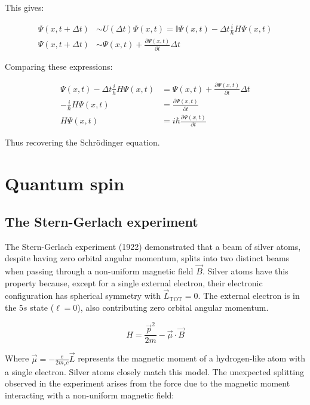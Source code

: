 \documentclass[italian]{HKNdocument}
\begin{document}
This gives:

\begin{align}
\Psi(x, t+\Delta t) & \sim U(\Delta t) \Psi(x, t)=\mathbb{I} \Psi(x, t)-\Delta t \frac{i}{\hbar} H \Psi(x, t)  \label{eq:10.59}\\
\Psi(x, t+\Delta t) & \sim \Psi(x, t)+\frac{\partial \Psi(x, t)}{\partial t} \Delta t \label{eq:10.60}
\end{align}

Comparing these expressions:

\begin{align}
\Psi(x, t)-\Delta t \frac{i}{\hbar} H \Psi(x, t) & =\Psi(x, t)+\frac{\partial \Psi(x, t)}{\partial t} \Delta t \\
-\frac{i}{\hbar} H \Psi(x, t) & =\frac{\partial \Psi(x, t)}{\partial t}  \label{eq:10.61}\\
H \Psi(x, t) & =i \hbar \frac{\partial \Psi(x, t)}{\partial t}
\end{align}

Thus recovering the Schrödinger equation.

\section{Quantum spin}
\subsection{The Stern-Gerlach experiment}
The Stern-Gerlach experiment (1922) demonstrated that a beam of silver atoms, despite having zero orbital angular momentum, splits into two distinct beams when passing through a non-uniform magnetic field $\vec{B}$. Silver atoms have this property because, except for a single external electron, their electronic configuration has spherical symmetry with $\vec{L}_{\text{TOT}}=0$. The external electron is in the $5s$ state ($\ell=0$), also contributing zero orbital angular momentum.


\begin{equation}
H=\frac{\vec{p}^{2}}{2 m}-\vec{\mu} \cdot \vec{B} \label{eq:11.1}
\end{equation}

Where $\vec{\mu}=-\frac{e}{2 m_{e} c} \vec{L}$ represents the magnetic moment of a hydrogen-like atom with a single electron. Silver atoms closely match this model. The unexpected splitting observed in the experiment arises from the force due to the magnetic moment interacting with a non-uniform magnetic field:
\end{document}
